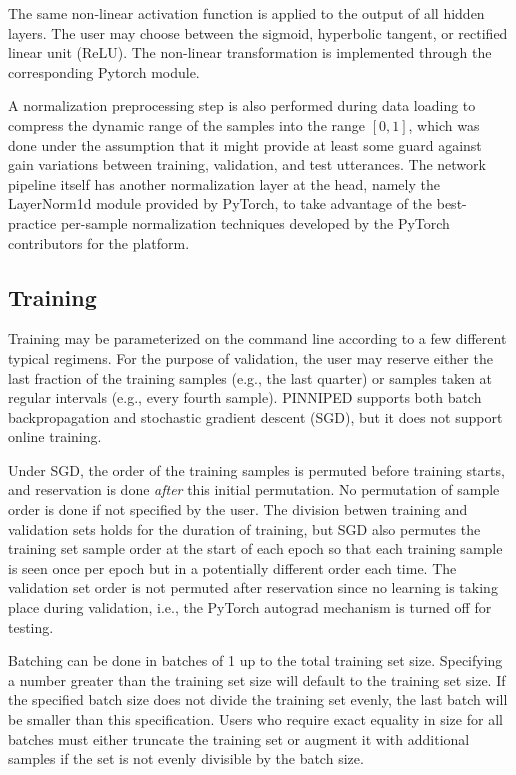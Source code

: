 \documentclass[10pt,epsf]{article}
\begin{document}
{{    The same non-linear activation function is applied to the output of all hidden layers. The user
    may choose between the sigmoid, hyperbolic tangent, or rectified linear unit (ReLU). The non-linear
    transformation is implemented through the corresponding Pytorch module.

    A normalization preprocessing step is also performed during data loading to compress the dynamic
    range of the samples into the range $[0,1]$, which was done under the assumption that it might
    provide at least some guard against gain variations between training, validation, and test utterances.
    The network pipeline itself has another normalization layer at the head, namely the LayerNorm1d module
    provided by PyTorch, to take advantage of the best-practice per-sample normalization techniques
    developed by the PyTorch contributors for the platform.
  }

  \subsection{Training}{
    Training may be parameterized on the command line according to a few different typical regimens.
    For the purpose of validation, the user may reserve either the last fraction of the training samples
    (e.g., the last quarter) or samples taken at regular intervals (e.g., every fourth sample).
    PINNIPED supports both batch backpropagation and stochastic gradient descent (SGD), but it does not
    support online training.

    Under SGD, the order of the training samples is permuted before training starts\autocite{torchshuffle},
    and reservation is done \emph{after} this initial permutation. No permutation of sample order is done
    if not specified by the user. The division betwen training and validation sets holds for the duration
    of training, but SGD also permutes the training set sample order at the start of each epoch so that
    each training sample is seen once per epoch but in a potentially different order each time.
    The validation set order is not permuted after reservation since no learning is taking place during
    validation, i.e., the PyTorch autograd mechanism is turned off for testing.

    Batching can be done in batches of 1 up to the total training set size. Specifying a number greater
    than the training set size will default to the training set size. If the specified batch size does
    not divide the training set evenly, the last batch will be smaller than this specification. Users who
    require exact equality in size for all batches must either truncate the training set or augment it
    with additional samples if the set is not evenly divisible by the batch size.

}}
\end{document}

